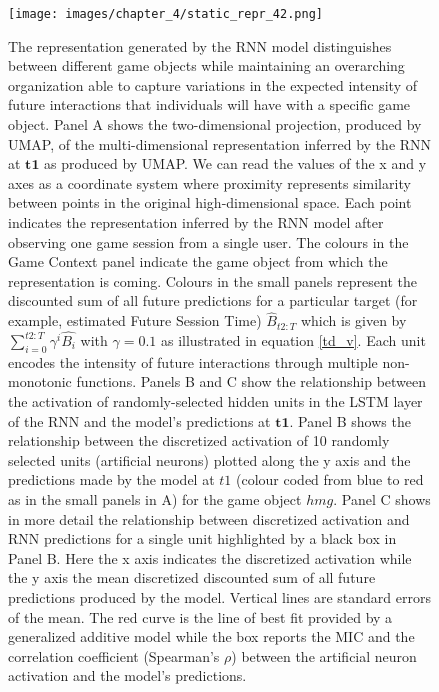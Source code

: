 \begin{figure}[!htb]
\centering
\texttt{[image: images/chapter\_4/static\_repr\_42.png]}
\caption[\textbf{Lower dimensional representation of the latent state generated by the RNN architecture}]{The representation generated by the RNN model distinguishes between different game objects while maintaining an overarching organization able to capture variations in the expected intensity of future interactions that individuals will have with a specific game object. Panel A shows the two-dimensional projection, produced by UMAP, of the multi-dimensional representation inferred by the RNN at $\mathbf{t1}$ as produced by UMAP. We can read the values of the x and y axes as a coordinate system where proximity represents similarity between points in the original high-dimensional space. Each point indicates the representation inferred by the RNN model after observing one game session from a single user. The colours in the Game Context panel indicate the game object from which the representation is coming. Colours in the small panels represent the discounted sum of all future predictions for a particular target (for example, estimated Future Session Time) $\widehat{B}_{t2:T}$ which is given by $\sum_{i=0}^{t2:T} \gamma^i\widehat{B_i}$ with $\gamma=0.1$ as illustrated in equation \ref{td_v}. Each unit  encodes the intensity of future interactions through multiple non-monotonic functions. Panels B and C show the relationship between the activation of randomly-selected hidden units in the LSTM layer of the RNN and the model's predictions at $\mathbf{t1}$. Panel B shows the relationship between the discretized activation of 10 randomly selected units (artificial neurons) plotted along the y axis and the predictions made by the model at $t1$ (colour coded from blue to red as in the small panels in A) for the game object $hmg$. Panel C shows in more detail the relationship between discretized activation and RNN predictions for a single unit highlighted by a black box in Panel B. Here the x axis indicates the discretized activation while the y axis the mean discretized discounted sum of all future predictions produced by the model. Vertical lines are standard errors of the mean. The red curve is the line of best fit provided by a generalized additive model \cite{serven2018} while the box reports the MIC and the correlation coefficient (Spearman's $\rho$) between the artificial neuron activation and the model's predictions.}
\label{full_panel_static}
\end{figure}

